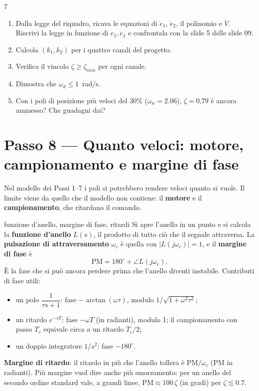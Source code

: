 \documentclass[11pt,a4paper]{article}
\begin{document}
\begin{esercizio}{7}
\begin{enumerate}[label=(\alph*)]
  \item Dalla legge del riquadro, ricava le equazioni di $\dot e_1$, $\dot e_2$, il polinomio e $\dot V$. Riscrivi la legge in funzione di $e_1, \dot e_1$ e confrontala con la slide 5 delle slide 09.
  \item Calcola $(k_1, k_2)$ per i quattro canali del progetto.
  \item Verifica il vincolo $\zeta \ge \zeta_{min}$ per ogni canale.
  \item Dimostra che $\omega_d \le 1$~rad/s.
  \item Con i poli di posizione più veloci del 30\% ($\omega_n = 2.06$), $\zeta = 0.79$ è ancora ammesso? Che guadagni dai?
\end{enumerate}
\end{esercizio}

\section{Passo 8 --- Quanto veloci: motore, campionamento e margine di fase}

Nel modello dei Passi 1--7 i poli si potrebbero rendere veloci quanto si vuole. Il limite viene da quello che il modello non contiene: il \textbf{motore} e il \textbf{campionamento}, che ritardano il comando.

\begin{teoria}{funzione d'anello, margine di fase, ritardi}
Si apre l'anello in un punto e si calcola la \textbf{funzione d'anello} $L(s)$, il prodotto di tutto ciò che il segnale attraversa. La \textbf{pulsazione di attraversamento} $\omega_c$ è quella con $|L(j\omega_c)| = 1$, e il \textbf{margine di fase} è
\[
\mathrm{PM} = 180^\circ + \angle L(j\omega_c).
\]
È la fase che si può ancora perdere prima che l'anello diventi instabile. Contributi di fase utili:
\begin{itemize}
  \item un polo $\dfrac{1}{\tau s + 1}$: fase $-\arctan(\omega\tau)$, modulo $1/\sqrt{1 + \omega^2\tau^2}$;
  \item un ritardo $e^{-sT}$: fase $-\omega T$ (in radianti), modulo 1; il campionamento con passo $T_c$ equivale circa a un ritardo $T_c/2$;
  \item un doppio integratore $1/s^2$: fase $-180^\circ$.
\end{itemize}
\textbf{Margine di ritardo}: il ritardo in più che l'anello tollera è $\mathrm{PM}/\omega_c$ (PM in radianti). Più margine vuol dire anche più smorzamento: per un anello del secondo ordine standard vale, a grandi linee, $\mathrm{PM} \approx 100\,\zeta$ (in gradi) per $\zeta \lesssim 0.7$.
\end{teoria}
\end{document}

